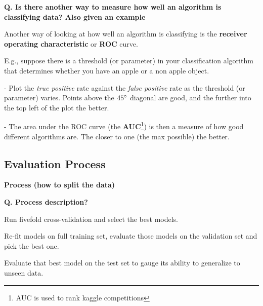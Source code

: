 \begin{frame}[fragile]{\textbf{Q. Is there another way to measure how well an
      algorithm is classifying data? Also given an example}}
  \begin{wideitemize}
  \item Another way of looking at how well an algorithm is classifying is the
    \textbf{receiver operating characteristic} or \textbf{ROC} curve.
    \item E.g., suppose there is a threshold (or parameter) in your
      classification algorithm that determines whether you have an apple or a
      non apple object.
      \begin{wideitemize}
      \item[-] Plot the \textit{true positive} rate against the
        \textit{false positive} rate as the threshold (or parameter) varies.
        Points above the $45\degree$ diagonal are good, and the further
        into the top left of the plot the better.
      \item[-] The area under the ROC curve (the \textbf{AUC}\footnote{AUC is
          used to rank kaggle competitions}) is then a measure of how
        good different algorithms are. The closer to one (the max possible) the better.
      \end{wideitemize}
  \end{wideitemize}
\end{frame}


\subsection{Evaluation Process}
\begin{transitionsubframe}
  \begin{center}
    \Huge \textbf{Process (how to split the data)}
  \end{center}
\end{transitionsubframe}

\begin{frame}[fragile]{\textbf{Q. Process description?}}
  \begin{wideitemize}
  \item Run fivefold cross-validation and select the best models.
  \item Re-fit models on full training set, evaluate those models
  on the validation set and pick the best one.
  \item Evaluate that best model on the test set to gauge its ability
  to generalize to unseen data.
  \end{wideitemize}
\end{frame}

